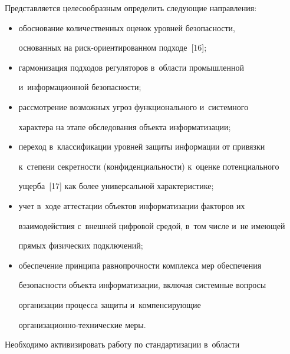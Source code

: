    


   Представляется целесообразным определить следующие направления:


   \begin{itemize}


   \item обоснование количественных оценок уровней безопас\-ности, 


основанных на риск-ори\-ен\-ти\-ро\-ван\-ном подходе~[16];\\[-14pt]


   \item гармонизация подходов регуляторов в~области промышленной 


и~информационной безопасности;\\[-14pt]


   \item рассмотрение возможных угроз функционального и~системного 


характера на этапе обследования объекта информатизации;\\[-14pt]


   \item переход в~классификации уровней защиты информации от привязки 


к~степени секретности (конфиденциальности) к~оценке потенциального 


ущерба~[17] как более универсальной характеристике;\\[-14pt] 


   \item учет в~ходе аттестации объектов информатизации факторов их 


взаимодействия с~внешней цифровой средой, в~том числе и~не име\-ющей 


прямых физических подключений;\\[-14pt] 


   \item обеспечение принципа равнопрочности комплекса мер обеспечения 


безопасности объекта информатизации, включая системные вопросы 


организации процесса защиты и~компенсирующие  


ор\-га\-ни\-за\-ци\-он\-но-тех\-ни\-че\-ские меры. 


   \end{itemize}


   


   Необходимо активизировать работу по стандартизации в~области  


